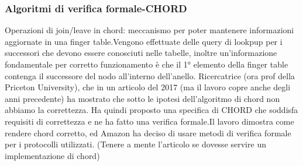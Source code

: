 \documentclass[16px]{article}
\begin{document}
\subsubsection{Algoritmi di verifica formale-CHORD}
Operazioni di join/leave in chord: meccanismo per poter mantenere informazioni aggiornate in una finger table.Vengono effettuate delle query di lookpup per i successori che devono essere conosciuti nelle tabelle, inoltre un'informazione fondamentale per corretto funzionamento è che il 1° elemento della finger table contenga il successore del nodo all'interno dell'anello. Ricercatrice (ora prof della Priceton University), che in un articolo del 2017 (ma il lavoro copre anche degli anni precedente) ha mostrato che sotto le ipotesi dell'algoritmo di chord non abbiamo la correttezza. Ha quindi proposto una specifica di CHORD che soddisfa requisiti di correttezza e ne ha fatto una verifica formale.Il lavoro dimostra come rendere chord corretto, ed Amazon ha deciso di usare metodi di verifica formale per i protocolli utilizzati.
(Tenere a mente l'articolo se dovesse servire un implementazione di chord)
\end{document}
